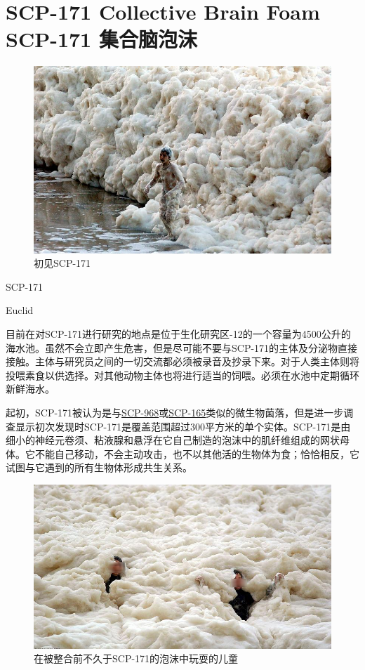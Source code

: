 \chapter[SCP-171 集合脑泡沫]{
    SCP-171 Collective Brain Foam\\
    SCP-171 集合脑泡沫
}

\label{chap:SCP-171}

\begin{figure}[H]
    \centering
    \includegraphics[width=0.5\linewidth]{images/SCP-171.jpg}
    \caption*{初见SCP-171}
\end{figure}

SCP-171

Euclid

目前在对SCP-171进行研究的地点是位于生化研究区-12的一个容量为4500公升的海水池。虽然不会立即产生危害，但是尽可能不要与SCP-171的主体及分泌物直接接触。主体与研究员之间的一切交流都必须被录音及抄录下来。对于人类主体则将投喂素食以供选择。对其他动物主体也将进行适当的饲喂。必须在水池中定期循环新鲜海水。

起初，SCP-171被认为是与\hyperref[chap:SCP-968]{SCP-968}或\hyperref[chap:SCP-165]{SCP-165}类似的微生物菌落，但是进一步调查显示初次发现时SCP-171是覆盖范围超过300平方米的单个实体。SCP-171是由细小的神经元卷须、粘液腺和悬浮在它自己制造的泡沫中的肌纤维组成的网状母体。它不能自己移动，不会主动攻击，也不以其他活的生物体为食；恰恰相反，它试图与它遇到的所有生物体形成共生关系。

\begin{figure}[H]
    \centering
    \includegraphics[width=0.5\linewidth]{images/SCP-171-2.jpg}
    \caption*{在被整合前不久于SCP-171的泡沫中玩耍的儿童}
\end{figure}

